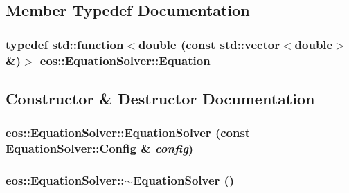 \subsection{Member Typedef Documentation}
\hypertarget{classeos_1_1EquationSolver_a7394803ea85312852151a700b59da572}{
\subsubsection[{Equation}]{\setlength{\rightskip}{0pt plus 5cm}typedef std::function$<$double (const std::vector$<$double$>$ \&)$>$ {\bf eos::EquationSolver::Equation}}}
\label{classeos_1_1EquationSolver_a7394803ea85312852151a700b59da572}


\subsection{Constructor \& Destructor Documentation}
\hypertarget{classeos_1_1EquationSolver_a39179766f370890b207dd9c00f0009b8}{
\subsubsection[{EquationSolver}]{\setlength{\rightskip}{0pt plus 5cm}eos::EquationSolver::EquationSolver (const {\bf EquationSolver::Config} \& {\em config})}}
\label{classeos_1_1EquationSolver_a39179766f370890b207dd9c00f0009b8}
\hypertarget{classeos_1_1EquationSolver_ac96461e85b095b1bff966a0d07542310}{
\subsubsection[{$\sim$EquationSolver}]{\setlength{\rightskip}{0pt plus 5cm}eos::EquationSolver::$\sim$EquationSolver ()}}
\label{classeos_1_1EquationSolver_ac96461e85b095b1bff966a0d07542310}


